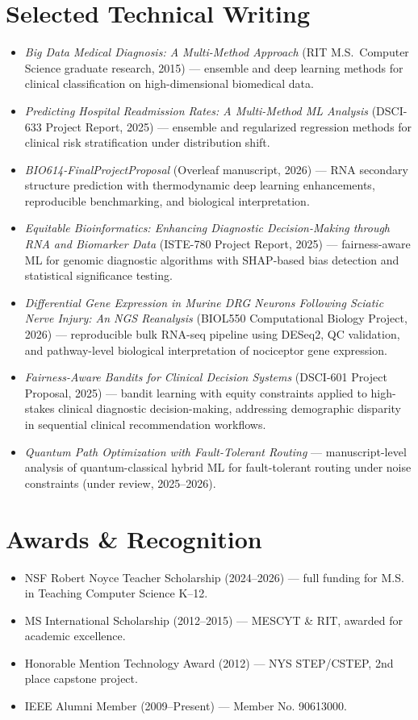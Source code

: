 \documentclass[11pt]{article}
\begin{document}
\section{Selected Technical Writing}
\begin{itemize}
  \item \textit{Big Data Medical Diagnosis: A Multi-Method Approach} (RIT M.S.\ Computer Science graduate research, 2015) --- ensemble and deep learning methods for clinical classification on high-dimensional biomedical data.
  \item \textit{Predicting Hospital Readmission Rates: A Multi-Method ML Analysis} (DSCI-633 Project Report, 2025) --- ensemble and regularized regression methods for clinical risk stratification under distribution shift.
  \item \textit{BIO614-FinalProjectProposal} (Overleaf manuscript, 2026) --- RNA secondary structure prediction with thermodynamic deep learning enhancements, reproducible benchmarking, and biological interpretation.
  \item \textit{Equitable Bioinformatics: Enhancing Diagnostic Decision-Making through RNA and Biomarker Data} (ISTE-780 Project Report, 2025) --- fairness-aware ML for genomic diagnostic algorithms with SHAP-based bias detection and statistical significance testing.
  \item \textit{Differential Gene Expression in Murine DRG Neurons Following Sciatic Nerve Injury: An NGS Reanalysis} (BIOL550 Computational Biology Project, 2026) --- reproducible bulk RNA-seq pipeline using DESeq2, QC validation, and pathway-level biological interpretation of nociceptor gene expression.
  \item \textit{Fairness-Aware Bandits for Clinical Decision Systems} (DSCI-601 Project Proposal, 2025) --- bandit learning with equity constraints applied to high-stakes clinical diagnostic decision-making, addressing demographic disparity in sequential clinical recommendation workflows.
  \item \textit{Quantum Path Optimization with Fault-Tolerant Routing} --- manuscript-level analysis of quantum-classical hybrid ML for fault-tolerant routing under noise constraints (under review, 2025--2026).
\end{itemize}

\section{Awards \& Recognition}
\begin{itemize}
  \item NSF Robert Noyce Teacher Scholarship (2024--2026) --- full funding for M.S. in Teaching Computer Science K--12.
  \item MS International Scholarship (2012--2015) --- MESCYT \& RIT, awarded for academic excellence.
  \item Honorable Mention Technology Award (2012) --- NYS STEP/CSTEP, 2nd place capstone project.
  \item IEEE Alumni Member (2009--Present) --- Member No. 90613000.
\end{itemize}
\end{document}

